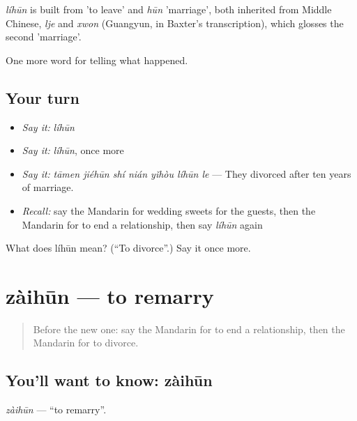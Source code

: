 \begin{cousinweb}
\emph{líhūn} is built from  'to leave' and \emph{hūn} 'marriage', both inherited from Middle Chinese, \emph{lje} and \emph{xwon} (Guangyun, in Baxter's transcription), which glosses the second 'marriage'.
\end{cousinweb}

\begin{grammarlens}[title={What you've built}]
One more word for telling what happened.
\end{grammarlens}

\subsection*{Your turn}
\begin{itemize}
\raggedright
  \item \emph{Say it:} \emph{líhūn}
  \item \emph{Say it:} \emph{líhūn}, once more
  \item \emph{Say it:} \emph{tāmen jiéhūn shí nián yǐhòu líhūn le} — They divorced after ten years of marriage.
  \item \emph{Recall:} say the Mandarin for wedding sweets for the guests, then the Mandarin for to end a relationship, then say \emph{líhūn} again
\end{itemize}

\begin{tcolorbox}[breakable,colback=teal!4,colframe=teal!35!black,title={Before you move on}]
What does líhūn mean? (\textquotedblleft{}To divorce\textquotedblright{}.) Say it once more.
\end{tcolorbox}
\section[zàihūn]{zàihūn — to remarry}

\label{lesson:ZH-C307-zaihun}



\begin{quote}
Before the new one: say the Mandarin for to end a relationship, then the Mandarin for to divorce.
\end{quote}

\subsection*{You'll want to know: zàihūn}
\emph{zàihūn} — \textquotedblleft{}to remarry\textquotedblright{}.


